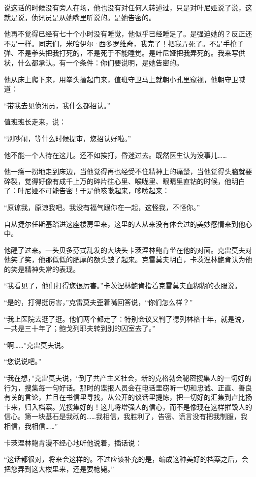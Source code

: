说这话的时候没有旁人在场，他也没有对任何人转述过，只是对叶尼娅说了说，这就是说，侦讯员是从她嘴里听说的。是她告密的。

他再不觉得已经有七十个小时没有睡觉，他似乎已经睡足了。是强迫她的？反正还不是一样。同志们，米哈伊尔·西多罗维奇，我完了！把我弄死了。不是手枪子弹、不是拳头把我打死的，不是死于不能睡觉。是叶尼娅把我弄死的。我来写供状，什么都承认。有一个条件：你们要说明，是她告密的。

他从床上爬下来，用拳头擂起门来，值班守卫马上就朝小孔里窥视，他朝守卫喊道：

“带我去见侦讯员，我什么都招认。”

值班班长走来，说：

“别吵闹，等什么时候提审，您招认好啦。”

他不能一个人待在这儿。还不如挨打，昏迷过去。既然医生认为没事儿……

他一瘸一拐地走到床边，当他觉得再也经受不住精神上的痛楚，当他觉得头脑就要碎裂，觉得好像有成千上万的碎片往心里、喉咙里、眼睛里直钻的时候，他明白了：叶尼娅不可能告密！于是他咳嗽起来，哆嗦起来：

“原谅我，原谅我吧。我没有福气跟你在一起，这怪我，不怪你。”

自从捷尔任斯基踏进这座楼房里来，这里的人从来没有体会过的美妙感情来到他心中。

他醒了过来。一头贝多芬式乱发的大块头卡茨涅林鲍肯坐在他的对面。克雷莫夫对他笑了笑，他那低低的肥厚的额头皱了起来。克雷莫夫明白，卡茨涅林鲍肯认为他的笑是精神失常的表现。

“我看见了，他们打得您很厉害。”卡茨涅林鲍肯指着克雷莫夫血糊糊的衣服说。

“是的，打得挺厉害，”克雷莫夫歪着嘴回答说，“你们怎么样？”

“我上医院去逛了逛。他们两个都走了：特别会议又判了德列林格十年，就是说，一共是三十年了；鲍戈列耶夫转到别的囚室去了。”

“啊……”克雷莫夫说。

“您说说吧。”

“我在想，”克雷莫夫说，“到了共产主义社会，新的克格勃会秘密搜集人的一切好的行为，搜集每一句好话。那时的谍报人员会在电话里窃听一切和忠诚、正直、善良有关的言论，并且在书信里寻找，从公开的谈话里提炼，把一切好的汇集到卢比扬卡来，归入档案。光搜集好的！这儿将增强人的信心，而不是像现在这样摧毁人的信心。第一块基石是我砌的……我相信，我胜利了，告密、谎言没有把我制服，我相信，我相信……”

卡茨涅林鲍肯漫不经心地听他说着，插话说：

“这话都很对，将来会这样的。不过应该补充的是，编成这种美好的档案之后，会把您弄到这大楼里来，还是要枪毙。”

